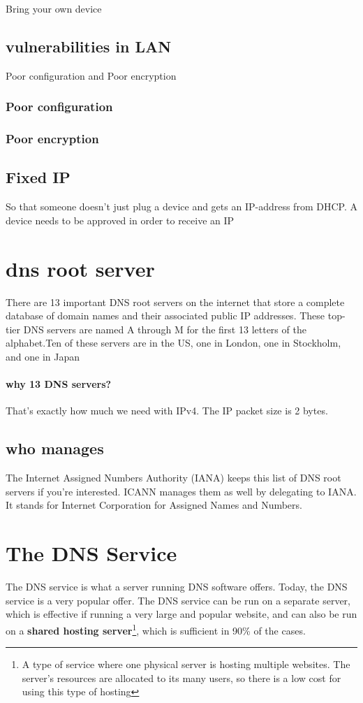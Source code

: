 \documentclass[a4paper,12pt]{book}
\begin{document}
Bring your own device

\subsection{vulnerabilities in LAN}
Poor configuration and Poor encryption

\subsubsection{Poor configuration}

\subsubsection{Poor encryption}


\subsection{Fixed IP}
So that someone doesn't just plug a device and gets an IP-address from DHCP. A device needs to be approved in order to receive an IP

\section{dns root server}
There are 13 important DNS root servers on the internet that store a complete database of domain names and their associated public IP addresses. These top-tier DNS servers are named A through M for the first 13 letters of the alphabet.Ten of these servers are in the US, one in London, one in Stockholm, and one in Japan 

\paragraph{why 13 DNS servers?}
\begin{flushleft}
That's exactly how much we need with IPv4. The IP packet size is 2 bytes.
\end{flushleft}

\subsection{who manages}
The Internet Assigned Numbers Authority (IANA) keeps this list of DNS root servers if you're interested. ICANN manages them as well by delegating to IANA. It stands for Internet Corporation for Assigned Names and Numbers.

\section{The DNS Service}
The DNS service is what a server running DNS software offers. Today, the DNS service is a very popular offer. The DNS service can be run on a separate server, which is effective if running a very large and popular website, and can also be run on a \textbf{shared hosting server}\footnote{\label{sharedHostingServer}A type of service where one physical server is hosting multiple websites. The server’s resources are allocated to its many users, so there is a low cost for using this type of hosting}, which is sufficient in 90\% of the cases.
\end{document}

